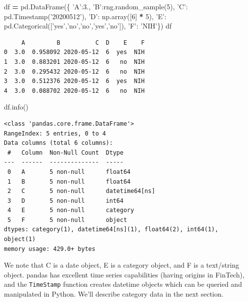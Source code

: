 \documentclass[
  letterpaper,
]{scrbook}
\newenvironment{Shaded}{\begin{snugshade}}{\end{snugshade}}
\newcommand{\DecValTok}[1]{\textcolor[rgb]{0.00,0.00,0.81}{#1}}
\newcommand{\FloatTok}[1]{\textcolor[rgb]{0.00,0.00,0.81}{#1}}
\newcommand{\NormalTok}[1]{#1}
\newcommand{\OperatorTok}[1]{\textcolor[rgb]{0.81,0.36,0.00}{\textbf{#1}}}
\newcommand{\StringTok}[1]{\textcolor[rgb]{0.31,0.60,0.02}{#1}}
\begin{document}
\begin{Shaded}
\begin{Highlighting}[]
\NormalTok{df }\OperatorTok{=}\NormalTok{ pd.DataFrame(\{}
    \StringTok{'A'}\NormalTok{:}\FloatTok{3.}\NormalTok{,}
    \StringTok{'B'}\NormalTok{:rng.random_sample(}\DecValTok{5}\NormalTok{),}
    \StringTok{'C'}\NormalTok{: pd.Timestamp(}\StringTok{'20200512'}\NormalTok{),}
    \StringTok{'D'}\NormalTok{: np.array([}\DecValTok{6}\NormalTok{] }\OperatorTok{*} \DecValTok{5}\NormalTok{),}
    \StringTok{'E'}\NormalTok{: pd.Categorical([}\StringTok{'yes'}\NormalTok{,}\StringTok{'no'}\NormalTok{,}\StringTok{'no'}\NormalTok{,}\StringTok{'yes'}\NormalTok{,}\StringTok{'no'}\NormalTok{]),}
    \StringTok{'F'}\NormalTok{: }\StringTok{'NIH'}\NormalTok{\})}
\NormalTok{df}
\end{Highlighting}
\end{Shaded}

\begin{verbatim}
     A         B          C  D    E    F
0  3.0  0.958092 2020-05-12  6  yes  NIH
1  3.0  0.883201 2020-05-12  6   no  NIH
2  3.0  0.295432 2020-05-12  6   no  NIH
3  3.0  0.512376 2020-05-12  6  yes  NIH
4  3.0  0.088702 2020-05-12  6   no  NIH
\end{verbatim}

\begin{Shaded}
\begin{Highlighting}[]
\NormalTok{df.info()}
\end{Highlighting}
\end{Shaded}

\begin{verbatim}
<class 'pandas.core.frame.DataFrame'>
RangeIndex: 5 entries, 0 to 4
Data columns (total 6 columns):
 #   Column  Non-Null Count  Dtype         
---  ------  --------------  -----         
 0   A       5 non-null      float64       
 1   B       5 non-null      float64       
 2   C       5 non-null      datetime64[ns]
 3   D       5 non-null      int64         
 4   E       5 non-null      category      
 5   F       5 non-null      object        
dtypes: category(1), datetime64[ns](1), float64(2), int64(1), object(1)
memory usage: 429.0+ bytes
\end{verbatim}

We note that C is a date object, E is a category object, and F is a text/string object. pandas has excellent time series capabilities (having origins in FinTech), and the \texttt{TimeStamp} function creates datetime objects which can be queried and manipulated in Python. We'll describe category data in the next section.
\end{document}
